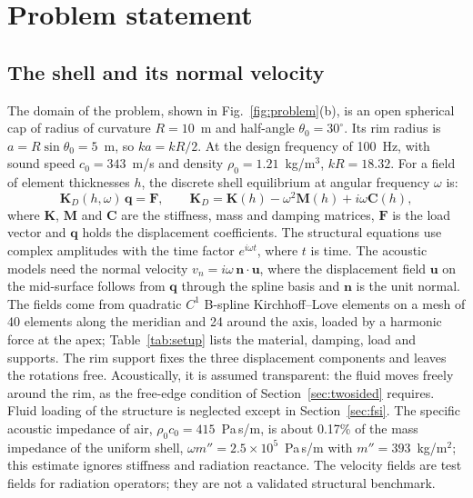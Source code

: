 \documentclass[preprint,12pt]{elsarticle}
\begin{document}
\section{Problem statement}
\label{sec:problem}
\subsection{The shell and its normal velocity}
\label{sec:shell}
The domain of the problem, shown in Fig.~\ref{fig:problem}(b), is an open spherical cap of radius of curvature $R=10$~m and half-angle $\theta_0=30^\circ$. %
Its rim radius is $a=R\sin\theta_0=5$~m, so $ka=kR/2$. At the design frequency of 100~Hz, with sound speed $c_0=343$~m/s and density $\rho_0=1.21$~kg/m$^3$, $kR=18.32$. For a field of element thicknesses $h$, the discrete shell equilibrium at angular frequency $\omega$ is:
\begin{equation}
  \mathbf K_D(h,\omega)\,\mathbf q=\mathbf F,
  \qquad \mathbf K_D=\mathbf K(h)-\omega^2\mathbf M(h)+i\omega\mathbf C(h),
\end{equation}
where $\mathbf K$, $\mathbf M$ and $\mathbf C$ are the stiffness, mass and damping matrices, $\mathbf F$ is the load vector and $\mathbf q$ holds the displacement coefficients. The structural equations use complex amplitudes with the time factor $e^{i\omega t}$, where $t$ is time. The acoustic models need the normal velocity $v_n=i\omega\,\mathbf n\cdot\mathbf u$, where the displacement field $\mathbf u$ on the mid-surface follows from $\mathbf q$ through the spline basis and $\mathbf n$ is the unit normal. %
The fields come from quadratic $C^1$ B-spline Kirchhoff--Love elements \cite{HughesCottrellBazilevs2005,Kiendl2009} on a mesh of 40 elements along the meridian and 24 around the axis, loaded by a harmonic force at the apex; Table~\ref{tab:setup} lists the material, damping, load and supports. The rim support fixes the three displacement components and leaves the rotations free. Acoustically, it is assumed transparent: the fluid moves freely around the rim, as the free-edge condition of Section~\ref{sec:twosided} requires. Fluid loading of the structure is neglected except in Section~\ref{sec:fsi}. The specific acoustic impedance of air, $\rho_0c_0=415$~Pa\,s/m, is about 0.17\% of the mass impedance of the uniform shell, $\omega m''=2.5\times10^5$~Pa\,s/m with $m''=393$~kg/m$^2$; this estimate ignores stiffness and radiation reactance. %
The velocity fields are test fields for radiation operators; they are not a validated structural benchmark.
\end{document}
